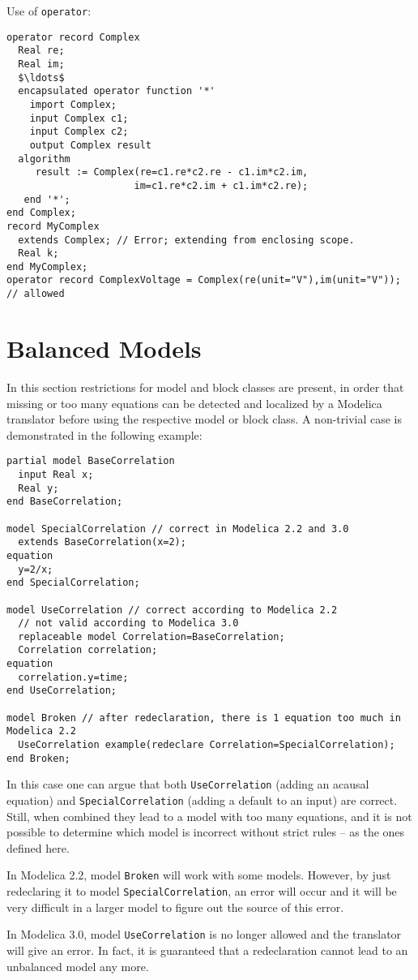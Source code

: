 \begin{example}
Use of \lstinline!operator!:
\begin{lstlisting}[language=modelica]
operator record Complex
  Real re;
  Real im;
  $\ldots$
  encapsulated operator function '*'
    import Complex;
    input Complex c1;
    input Complex c2;
    output Complex result
  algorithm
     result := Complex(re=c1.re*c2.re - c1.im*c2.im,
                      im=c1.re*c2.im + c1.im*c2.re);
   end '*';
end Complex;
record MyComplex
  extends Complex; // Error; extending from enclosing scope.
  Real k;
end MyComplex;
operator record ComplexVoltage = Complex(re(unit="V"),im(unit="V")); // allowed
\end{lstlisting}
\end{example}

\section{Balanced Models}\label{balanced-models}

\begin{nonnormative}
In this section restrictions for model and block classes are
present, in order that missing or too many equations can be detected and
localized by a Modelica translator before using the respective model or
block class. A non-trivial case is demonstrated in the following
example:
\begin{lstlisting}[language=modelica]
partial model BaseCorrelation
  input Real x;
  Real y;
end BaseCorrelation;

model SpecialCorrelation // correct in Modelica 2.2 and 3.0
  extends BaseCorrelation(x=2);
equation
  y=2/x;
end SpecialCorrelation;

model UseCorrelation // correct according to Modelica 2.2
  // not valid according to Modelica 3.0
  replaceable model Correlation=BaseCorrelation;
  Correlation correlation;
equation
  correlation.y=time;
end UseCorrelation;

model Broken // after redeclaration, there is 1 equation too much in Modelica 2.2
  UseCorrelation example(redeclare Correlation=SpecialCorrelation);
end Broken;
\end{lstlisting}

In this case one can argue that both \lstinline!UseCorrelation! (adding an acausal equation) and \lstinline!SpecialCorrelation! (adding a default to an input) are correct.  Still, when combined they
lead to a model with too many equations, and it is not possible to determine which model is incorrect without strict rules -- as the ones defined here.

In Modelica 2.2, model \lstinline!Broken! will work with some models.
However, by just redeclaring it to model \lstinline!SpecialCorrelation!, an
error will occur and it will be very difficult in a larger model to
figure out the source of this error.

In Modelica 3.0, model \lstinline!UseCorrelation! is no longer allowed
and the translator will give an error. In fact, it is guaranteed that a
redeclaration cannot lead to an unbalanced model any more.
\end{nonnormative}

